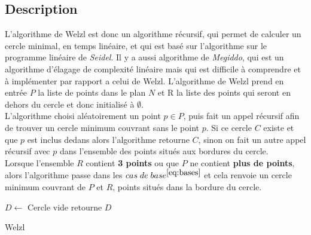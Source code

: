 \documentclass[12pt, a4paper, titlepage]{article}
\begin{document}
    \subsection{Description}
    L'algorithme de Welzl est donc un algorithme récursif, qui permet de calculer un cercle minimal, en temps linéaire, et qui est basé sur l'algorithme sur le programme linéaire de \textit{Seidel}. Il y a aussi algorithme de \textit{Megiddo}, qui est un algorithme d'élagage de complexité linéaire mais qui est difficile à comprendre et à implémenter par rapport a celui de Welzl.
    L'algorithme de Welzl prend en entrée $P$ la liste de points dans le plan $N$ et R la liste des points qui seront en dehors du cercle et donc initialisé à $\emptyset$.\\
    L'algorithme choisi aléatoirement un point $p \in P$, puis fait un appel récursif afin de trouver un cercle minimum couvrant sans le point $p$. Si ce cercle $C$ existe et que $p$ est inclus dedans alors l'algorithme retourne $C$, sinon on fait un autre appel récursif avec $p$ dans l'ensemble des points situés aux bordures du cercle.\\
    Lorsque l'ensemble $R$ contient \textbf{3 points} ou que $P$ ne contient \textbf{plus de points}, alors l'algorithme passe dans les $cas\; de\; base^{\eqref{eq:bases}}$ et cela renvoie un cercle minimum couvrant de $P$ et $R$, points situés dans la bordure du cercle.\\
    
    \begin{algorithm}[H]
    \SetAlgoLined
        $D \leftarrow$ Cercle vide\;
        retourne $D$
    \caption{Welzl}
    \end{algorithm}
\end{document}
